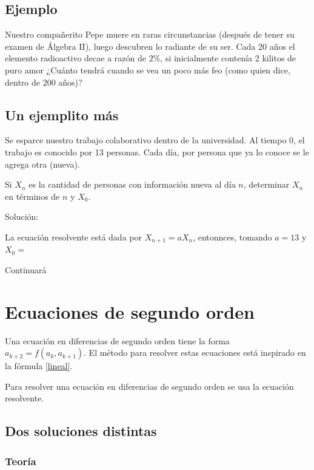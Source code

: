 \documentclass{article}
\begin{document}
\subsection{Ejemplo}

Nuestro compañerito Pepe muere en raras circunstancias (después de
tener su examen de Álgebra II), luego descubren lo radiante de su
ser. Cada 20 años el elemento radioactivo decae a razón de $2\%$, si
inicialmente contenía 2 kilitos de puro amor ¿Cuánto tendrá cuando se
vea un poco más feo (como quien dice, dentro de 200 años)?


\subsection{Un ejemplito más}

Se esparce nuestro trabajo colaborativo dentro de la universidad. Al tiempo 0, el trabajo es conocido por 13 personas. Cada día, por persona que ya lo conoce se le agrega otra (nueva).

Si $X_n$ es la cantidad de personas con información nueva al día $n$, determinar $X_n$ en términos de $n$ y $X_0$.

Solución:

La ecuación resolvente está dada por $X_{n+1}=aX_n$, entonnces, tomando $a=13$ y $X_0=$

Continuará


\section{Ecuaciones de segundo orden}

Una ecuación en diferencias de segundo orden tiene la forma $a_{k+2}=f(a_k,a_{k+1})$.
El método para resolver estas ecuaciones está inspirado en la fórmula \ref{lineal}.

Para resolver una ecuación en diferencias de segundo orden se usa la ecuación resolvente.



\subsection{Dos soluciones distintas}
\label{sec:distintas}

\subsubsection{Teoría}
\label{sec:teoriadistintas}
\end{document}
